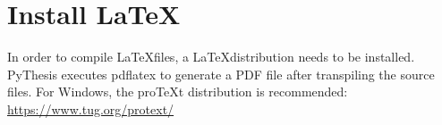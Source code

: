 \section{Install \LaTeX}
In order to compile \LaTeX files, a \LaTeX distribution needs to be installed. PyThesis executes pdflatex to generate a PDF file after transpiling the source files. For Windows, the proTeXt distribution is recommended: \url{https://www.tug.org/protext/}

